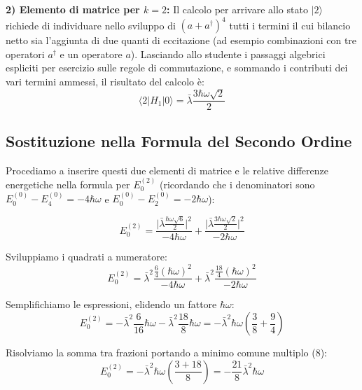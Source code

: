 \textbf{2) Elemento di matrice per $k=2$:}
Il calcolo per arrivare allo stato $\vert{}2\rangle$ richiede di individuare nello sviluppo di $(a+a^\dagger)^4$ tutti i termini il cui bilancio netto sia l'aggiunta di due quanti di eccitazione (ad esempio combinazioni con tre operatori $a^\dagger$ e un operatore $a$).
Lasciando allo studente i passaggi algebrici espliciti per esercizio sulle regole di commutazione, e sommando i contributi dei vari termini ammessi, il risultato del calcolo è:
\begin{equation}
\langle 2 | H_1 | 0 \rangle = \bar{\lambda} \frac{3\hbar \omega \sqrt{2}}{2}
\end{equation}

\subsection{Sostituzione nella Formula del Secondo Ordine}
Procediamo a inserire questi due elementi di matrice e le relative differenze energetiche nella formula per $E_0^{(2)}$ (ricordando che i denominatori sono $E_0^{(0)} - E_4^{(0)} = -4\hbar\omega$ e $E_0^{(0)} - E_2^{(0)} = -2\hbar\omega$):

\begin{equation}
E_0^{(2)} = \frac{\big| \bar{\lambda} \frac{\hbar \omega \sqrt{6}}{2} \big|^2}{-4\hbar\omega} + \frac{\big| \bar{\lambda} \frac{3\hbar \omega \sqrt{2}}{2} \big|^2}{-2\hbar\omega}
\end{equation}

Sviluppiamo i quadrati a numeratore:
\begin{equation}
E_0^{(2)} = \bar{\lambda}^2 \frac{\frac{6}{4} (\hbar \omega)^2}{-4\hbar\omega} + \bar{\lambda}^2 \frac{\frac{18}{4} (\hbar \omega)^2}{-2\hbar\omega}
\end{equation}

Semplifichiamo le espressioni, elidendo un fattore $\hbar\omega$:
\begin{equation}
E_0^{(2)} = - \bar{\lambda}^2 \frac{6}{16} \hbar\omega - \bar{\lambda}^2 \frac{18}{8} \hbar\omega = - \bar{\lambda}^2 \hbar\omega \left( \frac{3}{8} + \frac{9}{4} \right)
\end{equation}

Risolviamo la somma tra frazioni portando a minimo comune multiplo ($8$):
\begin{equation}
E_0^{(2)} = - \bar{\lambda}^2 \hbar\omega \left( \frac{3 + 18}{8} \right) = - \frac{21}{8} \bar{\lambda}^2 \hbar\omega
\end{equation}

